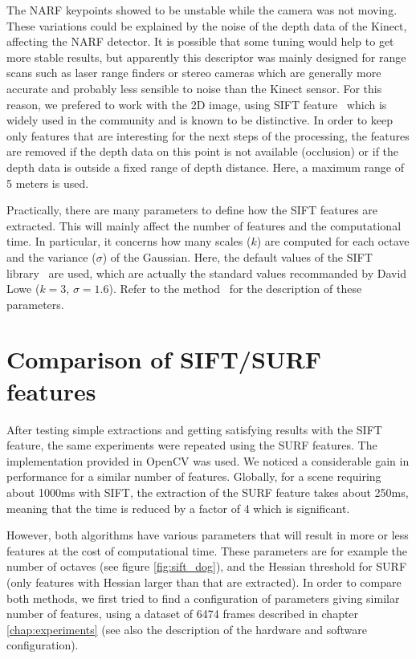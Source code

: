 The \gls{NARF} keypoints showed to be unstable while the camera was not moving. These variations could be explained by the noise of the depth data of the Kinect, affecting the \gls{NARF} detector. It is possible that some tuning would help to get more stable results, but apparently this descriptor was mainly designed for range scans such as laser range finders or stereo cameras which are generally more accurate and probably less sensible to noise than the Kinect sensor. For this reason, we prefered to work with the 2D image, using \gls{SIFT} feature~\cite{lowe_2004_sift} which is widely used in the community and is known to be distinctive. In order to keep only features that are interesting for the next steps of the processing, the features are removed if the depth data on this point is not available (occlusion) or if the depth data is outside a fixed range of depth distance. Here, a maximum range of 5 meters is used.

Practically, there are many parameters to define how the \gls{SIFT} features are extracted. This will mainly affect the number of features and the computational time. In particular, it concerns how many scales ($k$) are computed for each octave and the variance ($\sigma$) of the Gaussian. Here, the default values of the \gls{SIFT} library~\cite{hess_sift} are used, which are actually the standard values recommanded by David Lowe ($k=3$, $\sigma=1.6$). Refer to the method~\cite{lowe_2004_sift} for the description of these parameters.

\clearpage
\section{Comparison of SIFT/SURF features}
After testing simple extractions and getting satisfying results with the \gls{SIFT} feature, the same experiments were repeated using the \gls{SURF} features. The implementation provided in OpenCV was used. We noticed a considerable gain in performance for a similar number of features. Globally, for a scene requiring about 1000ms with \gls{SIFT}, the extraction of the \gls{SURF} feature takes about 250ms, meaning that the time is reduced by a factor of 4 which is significant.

However, both algorithms have various parameters that will result in more or less features at the cost of computational time. These parameters are for example the number of octaves (see figure \ref{fig:sift_dog}), and the Hessian threshold for SURF (only features with Hessian larger than that are extracted). In order to compare both methods, we first tried to find a configuration of parameters giving similar number of features, using a dataset of 6474 frames described in chapter \ref{chap:experiments} (see also the description of the hardware and software configuration).

